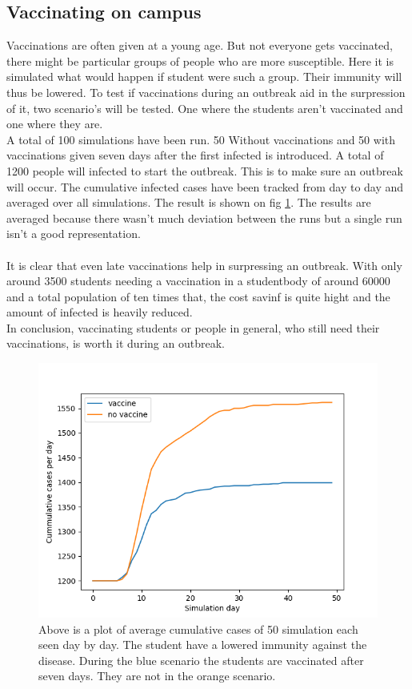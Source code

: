 \documentclass[runningheads]{llncs}
\begin{document}
\subsection{Vaccinating on campus}
Vaccinations are often given at a young age. But not everyone gets vaccinated, there might be particular groups of people who are more susceptible. Here it is simulated what would happen if student were such a group. Their immunity will thus be lowered. To test if vaccinations during an outbreak aid in the surpression of it, two scenario's will be tested. One where the students aren't vaccinated and one where they are.\\
A total of 100 simulations have been run. 50 Without vaccinations and 50 with vaccinations given seven days after the first infected is introduced. A total of 1200 people will infected to start the outbreak. This is to make sure an outbreak will occur. The cumulative infected cases have been tracked from day to day and averaged over all simulations. The result is shown on fig \ref{vax_campus}. The results are averaged because there wasn't much deviation between the runs but a single run isn't a good representation.\\ \\
It is clear that even late vaccinations help in surpressing an outbreak. With only around 3500 students needing a vaccination in a studentbody of around 60000 and a total population of ten times that, the cost savinf is quite hight and the amount of infected is heavily reduced. \\
In conclusion, vaccinating students or people in general, who still need their vaccinations, is worth it during an outbreak.
 
\begin{figure}[h!]
	\includegraphics[width=\textwidth]{student_vaccinations.png}
	\caption{Above is a plot of average cumulative cases of 50 simulation each seen day by day. The student have a lowered immunity against the disease. During the blue scenario the students are vaccinated after seven days. They are not in the orange scenario.}
	\label{vax_campus}
\end{figure}
\newpage
\end{document}
